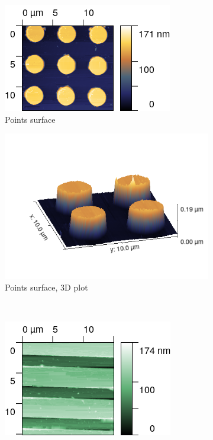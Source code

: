 \documentclass[11pt,a4paper]{article}
\begin{document}
\begin{figure}[H]
\centering
\begin{subfigure}[b]{0.45\textwidth}
\includegraphics[width=\textwidth]{tm_points}
\caption{Points surface}
\label{fig:}
\end{subfigure}
\begin{subfigure}[b]{0.45\textwidth}
\includegraphics[width=\textwidth]{tm_points_3D}
\caption{Points surface, 3D plot}
\label{fig:sm_raws}
\end{subfigure}\\\vspace{.2cm}
\begin{subfigure}[b]{0.45\textwidth}
\includegraphics[width=\textwidth]{tm_raws}

\end{subfigure}
\end{figure}
\end{document}
